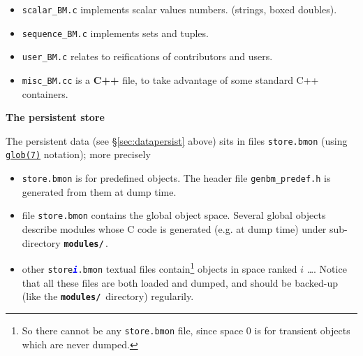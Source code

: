 \begin{appendices}
\begin{itemize}
  \item \texttt{scalar\_BM.c} implements scalar values
      
    numbers.  (strings,
    boxed doubles).

  \item \texttt{sequence\_BM.c} implements sets and
    tuples.

  \item \texttt{user\_BM.c} relates
     to reifications of
    contributors and  users.

  \item \texttt{misc\_BM.cc} is a \textbf{C++} file,
     to take advantage of
    some standard C++   containers.
\end{itemize}

{\large \textbf{The persistent store}}

The persistent data (see \S \ref{sec:datapersist} above) sits in files
 
 \texttt{store\textsection*.bmon}
(using
\href{https://man7.org/linux/man-pages/man7/glob.7.html}{\texttt{glob(7)}}
notation); more precisely

\begin{itemize}

\item \texttt{store.bmon} is for predefined objects. The header file
  \texttt{genbm\_predef.h} is generated from them at dump time.

\item file \texttt{store.bmon} contains the global object space. Several
  global objects describe modules whose C code is generated (e.g. at
  dump time)   under sub-directory
  \textbf{\texttt{modules/}}\,.

\item other \texttt{store\textsection\textcolor{blue}{\textbf{\textit{i}}}.bmon}
  textual files contain\footnote{So there cannot be any
    \texttt{store.bmon} file, since space 0 is for transient objects
    which are never dumped.}  objects in space ranked $i$ \ldots. Notice
  that all these files are both loaded and dumped, and should be
  backed-up (like the \textbf{\texttt{modules/}}\, directory)
  regularily.


\end{itemize}
\end{appendices}

